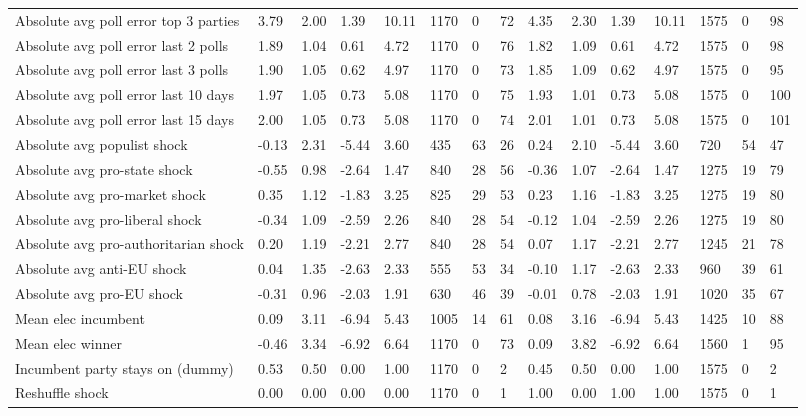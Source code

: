 \begin{longtable}{lllllllllllllll}
Absolute avg poll error top 3 parties & 3.79 & 2.00 & 1.39 & 10.11 & 1170 & 0 & 72 & 4.35 & 2.30 & 1.39 & 10.11 & 1575 & 0 & 98\\
\addlinespace
Absolute avg poll error last 2 polls & 1.89 & 1.04 & 0.61 & 4.72 & 1170 & 0 & 76 & 1.82 & 1.09 & 0.61 & 4.72 & 1575 & 0 & 98\\
Absolute avg poll error last 3 polls & 1.90 & 1.05 & 0.62 & 4.97 & 1170 & 0 & 73 & 1.85 & 1.09 & 0.62 & 4.97 & 1575 & 0 & 95\\
Absolute avg poll error last 10 days & 1.97 & 1.05 & 0.73 & 5.08 & 1170 & 0 & 75 & 1.93 & 1.01 & 0.73 & 5.08 & 1575 & 0 & 100\\
Absolute avg poll error last 15 days & 2.00 & 1.05 & 0.73 & 5.08 & 1170 & 0 & 74 & 2.01 & 1.01 & 0.73 & 5.08 & 1575 & 0 & 101\\
Absolute avg populist shock & -0.13 & 2.31 & -5.44 & 3.60 & 435 & 63 & 26 & 0.24 & 2.10 & -5.44 & 3.60 & 720 & 54 & 47\\
\addlinespace
Absolute avg pro-state shock & -0.55 & 0.98 & -2.64 & 1.47 & 840 & 28 & 56 & -0.36 & 1.07 & -2.64 & 1.47 & 1275 & 19 & 79\\
Absolute avg pro-market shock & 0.35 & 1.12 & -1.83 & 3.25 & 825 & 29 & 53 & 0.23 & 1.16 & -1.83 & 3.25 & 1275 & 19 & 80\\
Absolute avg pro-liberal shock & -0.34 & 1.09 & -2.59 & 2.26 & 840 & 28 & 54 & -0.12 & 1.04 & -2.59 & 2.26 & 1275 & 19 & 80\\
Absolute avg pro-authoritarian shock & 0.20 & 1.19 & -2.21 & 2.77 & 840 & 28 & 54 & 0.07 & 1.17 & -2.21 & 2.77 & 1245 & 21 & 78\\
Absolute avg anti-EU shock & 0.04 & 1.35 & -2.63 & 2.33 & 555 & 53 & 34 & -0.10 & 1.17 & -2.63 & 2.33 & 960 & 39 & 61\\
\addlinespace
Absolute avg pro-EU shock & -0.31 & 0.96 & -2.03 & 1.91 & 630 & 46 & 39 & -0.01 & 0.78 & -2.03 & 1.91 & 1020 & 35 & 67\\
Mean elec incumbent & 0.09 & 3.11 & -6.94 & 5.43 & 1005 & 14 & 61 & 0.08 & 3.16 & -6.94 & 5.43 & 1425 & 10 & 88\\
Mean elec winner & -0.46 & 3.34 & -6.92 & 6.64 & 1170 & 0 & 73 & 0.09 & 3.82 & -6.92 & 6.64 & 1560 & 1 & 95\\
Incumbent party stays on (dummy) & 0.53 & 0.50 & 0.00 & 1.00 & 1170 & 0 & 2 & 0.45 & 0.50 & 0.00 & 1.00 & 1575 & 0 & 2\\
Reshuffle shock & 0.00 & 0.00 & 0.00 & 0.00 & 1170 & 0 & 1 & 1.00 & 0.00 & 1.00 & 1.00 & 1575 & 0 & 1\\

\end{longtable}

